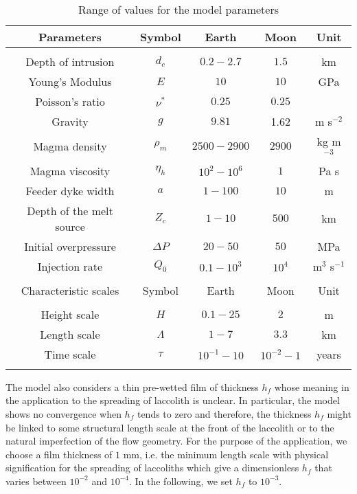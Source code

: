 \begin{table}[h!]
  \caption{Range of values for the model parameters}
  \centering
  \begin{tabular}{c|c|c|c|c}
    Parameters& Symbol & Earth & Moon&Unit\\
    \hline
              &&&&\\
    Depth of intrusion & $d_c$ & $0.2-2.7$ &$1.5$ &km \\
    Young's Modulus & $E$ & $10$ &$10$ &GPa \\
    Poisson's ratio & $\nu^*$ & $0.25$ &$0.25$ &\\
    Gravity & $g$ & $9.81$ &1.62&m s$^{-2}$ \\
    Magma density & $\rho_{m}$ & $2500-2900$ &$2900$&kg m$^{-3}$ \\
    Magma viscosity & $\eta_h $ & $10^2-10^{6}$ &$1$&Pa s \\
    Feeder dyke width & $a$ & $1-100$ &$10$&m \\
    Depth of the melt source & $Z_{c}$ & $ 1-10$&$ 500$& km \\ 
    Initial overpressure & $\Delta P$ & $20-50$ &$50$ &MPa \\
    Injection rate & $Q_{0}$ &$0.1-10^3$ &$10^4$&m$^{3}$ s$^{-1}$ \\
              &&&&\\
    \hline
    Characteristic scales & Symbol & Earth & Moon&Unit\\
    \hline
              &&&&\\
    Height scale & $H$& $0.1-25$ &$2$ &m \\
    Length scale & $\Lambda$ & $1-7$&$3.3$& km \\
    Time scale & $\tau$ & $10^{-1}-10$&$10^{-2}-1$& years \\
    \label{tab2}
  \end{tabular} 
\end{table}

The model  also considers  a thin pre-wetted  film of  thickness $h_f$
whose  meaning in  the application  to the  spreading of  laccolith is
unclear.  In  particular, the  model shows  no convergence  when $h_f$
tends to zero \citep{Lister:2013ia} and therefore, the thickness $h_f$
might be  linked to some structural  length scale at the  front of the
laccolith or  to the natural  imperfection of the flow  geometry.  For
the purpose of the application, we  choose a film thickness of $1$ mm,
i.e.  the  minimum length  scale with  physical signification  for the
spreading of laccoliths  which give a dimensionless  $h_f$ that varies
between $10^{-2}$  and $10^{-4}$.  In  the following, we set  $h_f$ to
$10^{-3}$.

